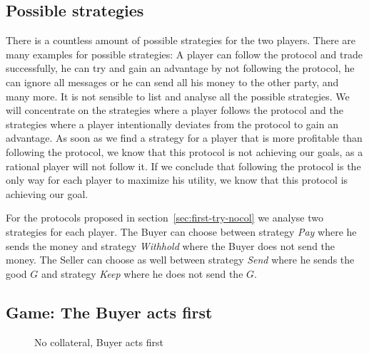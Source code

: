 \documentclass{cacthesis}
\begin{document}

\subsection{Possible strategies}
\label{sec:possible-strategies}
There is a countless amount of possible strategies for the two players. There are many examples for possible strategies: A player can follow the protocol and trade successfully, he can try and gain an advantage by not following the protocol, he can ignore all messages or he can send all his money to the other party, and many more. It is not sensible to list and analyse all the possible strategies. We will concentrate on the strategies where a player follows the protocol and the strategies where a player intentionally deviates from the protocol to gain an advantage. As soon as we find a strategy for a player that is more profitable than following the protocol, we know that this protocol is not achieving our goals, as a rational player will not follow it. If we conclude that following the protocol is the only way for each player to maximize his utility, we know that this protocol is achieving our goal. \newline

For the protocols proposed in section~\ref{sec:first-try-nocol} we analyse two strategies for each player. The Buyer can choose between strategy \emph{Pay} where he sends the money and strategy \emph{Withhold} where the Buyer does not send the money. The Seller can choose as well between strategy \emph{Send} where he sends the good $G$ and strategy \emph{Keep} where he does not send the $G$.
\subsection{Game: The Buyer acts first}
\begin{figure}[htb!]
\label{fig:nocol-Buyer-first}
\centering
\caption{No collateral, Buyer acts first}
\end{figure}
\end{document}
